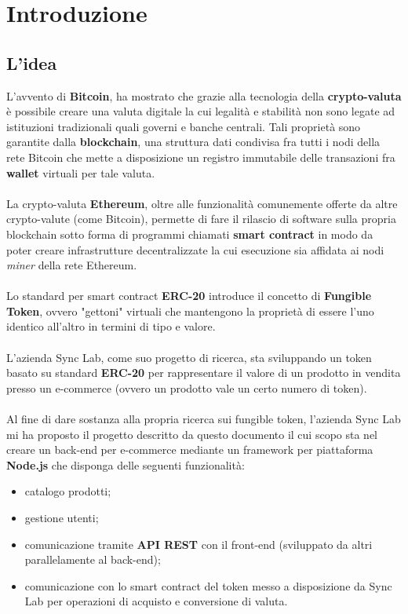 
\chapter{Introduzione}
\label{cap:introduzione}

\section{L'idea}
L'avvento di \textbf{Bitcoin}, ha mostrato che grazie alla tecnologia della \textbf{crypto-valuta} è possibile creare una valuta digitale la cui legalità e stabilità non sono legate ad istituzioni tradizionali quali governi e banche centrali. Tali proprietà sono garantite dalla \textbf{blockchain}, una struttura dati condivisa fra tutti i nodi della rete Bitcoin che mette a disposizione un registro immutabile delle transazioni fra \textbf{wallet} virtuali per tale valuta.
\\\\
La crypto-valuta \textbf{Ethereum}, oltre alle funzionalità comunemente offerte da altre crypto-valute (come Bitcoin), permette di fare il rilascio di software sulla propria blockchain sotto forma di programmi chiamati \textbf{smart contract} in modo da poter creare infrastrutture decentralizzate la cui esecuzione sia affidata ai nodi \textit{miner} della rete Ethereum.
\\\\
Lo standard per smart contract \textbf{ERC-20} introduce il concetto di \textbf{Fungible Token}, ovvero "gettoni" virtuali che mantengono la proprietà di essere l'uno identico all'altro in termini di tipo e valore.
\\\\
L'azienda Sync Lab, come suo progetto di ricerca, sta sviluppando un token basato su standard \textbf{ERC-20} per rappresentare il valore di un prodotto in vendita presso un e-commerce (ovvero un prodotto vale un certo numero di token).
\\\\
Al fine di dare sostanza alla propria ricerca sui fungible token, l'azienda Sync Lab mi ha proposto il progetto descritto da questo documento il cui scopo sta nel creare un back-end per e-commerce mediante un framework per piattaforma \textbf{Node.js} che disponga delle seguenti funzionalità:
\begin{itemize}
    \item catalogo prodotti;
    \item gestione utenti;
    \item comunicazione tramite \textbf{API REST} con il front-end (sviluppato da altri parallelamente al back-end);
    \item comunicazione con lo smart contract del token messo a disposizione da Sync Lab per operazioni di acquisto e conversione di valuta.
\end{itemize}


